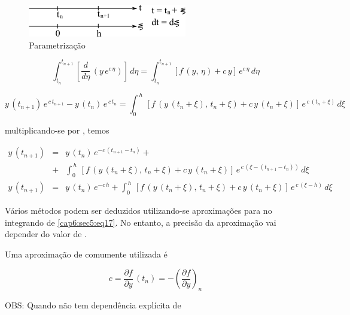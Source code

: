 \begin{figure}[htb]
 \centering
 \includegraphics[scale=1.0]{capitulos/capitulo6/figuras/equa_dif_ord_rig2.png}
 \caption{Parametrização}
 \label{fig:equa_dif_ord_rig2}
\end{figure}

\begin{equation}
 \label{cap6:sec5:eq14}
 \int^{t_{n+1}}_{t_n} \left[ \frac{d}{d\eta} \, (y \, e^{c\,\eta}) \right] \, d\eta
 =
 \int^{t_{n+1}}_{t_n} \left[ f \, (y, \, \eta) + c \, y \right] \, e^{c\,\eta} \, d\eta
\end{equation}

\begin{equation}
 \label{cap6:sec5:eq15}
 y \, (t_{n+1}) \, e^{\,c\,t_{n+1}} - y \, (t_n) \, e^{\,c\,t_n} = \int^{\,h}_0 \, [f \, (y \, (t_n + \xi), \, t_n + \xi) + c \, y \, (t_n + \xi)] \, e^{\,c \, (t_n + \xi)} \, d\xi
\end{equation}

multiplicando-se por , temos

\begin{eqnarray}
 y \, (t_{n+1}) & = & y \, (t_n) \, e^{-c\,(t_{n+1}-t_n)} + \nonumber \\
 \label{cap6:sec5:eq16}
                & + & \int^{\,h}_0 \, [f \, (y \, (t_n + \xi), \, t_n + \xi) + c \, y \, (t_n + \xi)] \, e^{\,c \, (\xi - (t_{n+1} - t_n))} \, d\xi \\
 \label{cap6:sec5:eq17}
 y \, (t_{n+1}) & = & y \, (t_n) \, e^{-c\,h} + \int^{\,h}_0 \, [f \, (y \, (t_n + \xi), \, t_n + \xi) + c \, y \, (t_n + \xi)] \, e^{\,c \, (\xi - h)} \, d\xi
\end{eqnarray}

Vários métodos podem ser deduzidos utilizando-se aproximações para  no integrando de \ref{cap6:sec5:eq17}. No entanto, a precisão da aproximação vai depender do valor de .

Uma aproximação de  comumente utilizada é

\begin{equation}
 \label{cap6:sec5:eq18}
 c = \frac{\partial f}{\partial y} \, (t_n) = - \left( \frac{\partial f}{\partial y} \right)_n
\end{equation}

OBS: Quando  não tem dependência explícita de

